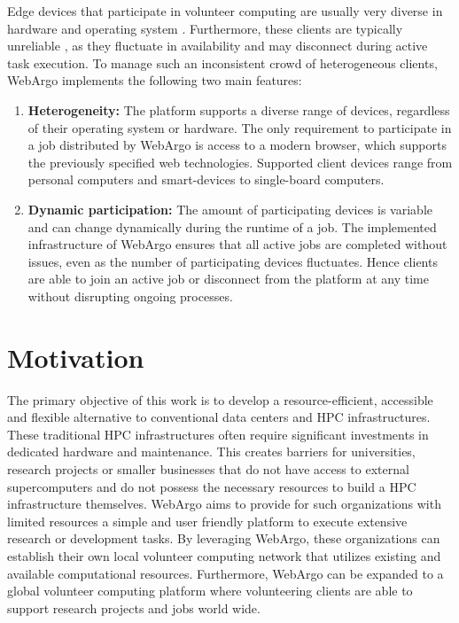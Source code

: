 Edge devices that participate in volunteer computing are usually very diverse in hardware and operating system \cite{intro:diverseDevices}. Furthermore, these clients are typically unreliable \cite{relatedwork:boinc1}, as they fluctuate in availability and may disconnect during active task execution. To manage such an inconsistent crowd of heterogeneous clients, WebArgo implements the following two main features:
\begin{enumerate}
    \item \textbf{Heterogeneity:} The platform supports a diverse range of devices, regardless of their operating system or hardware. The only requirement to participate in a job distributed by WebArgo is access to a modern browser, which supports the previously specified web technologies. Supported client devices range from personal computers and smart-devices to single-board computers.
    \item \textbf{Dynamic participation:} The amount of participating devices is variable and can change dynamically during the runtime of a job. The implemented infrastructure of WebArgo ensures that all active jobs are completed without issues, even as the number of participating devices fluctuates. Hence clients are able to join an active job or disconnect from the platform at any time without disrupting ongoing processes.
\end{enumerate}

\section{Motivation}
\label{sec:intro:motivation}
The primary objective of this work is to develop a resource-efficient, accessible and flexible alternative to conventional data centers and \ac{HPC} infrastructures. These traditional \ac{HPC} infrastructures often require significant investments in dedicated hardware and maintenance. This creates barriers for universities, research projects or smaller businesses that do not have access to external supercomputers and do not possess the necessary resources to build a \ac{HPC} infrastructure themselves. WebArgo aims to provide for such organizations with limited resources a simple and user friendly platform to execute extensive research or development tasks. By leveraging WebArgo, these organizations can establish their own local volunteer computing network that utilizes existing and available computational resources. Furthermore, WebArgo can be expanded to a global volunteer computing platform where volunteering clients are able to support research projects and jobs world wide.

